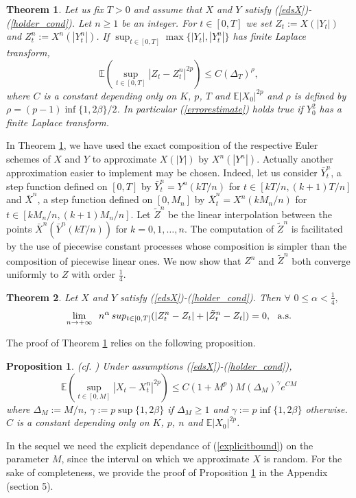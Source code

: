 \documentclass[a4paper, 11pt]{article}
\newtheorem{prop}{Proposition}
\newtheorem{thm}{Theorem}%
\newcommand{\E}{\mathbb{E}}
\newcommand{\1}{\mathbf{1}}
\begin{document}
\begin{thm}
\label{meanerror}
Let us fix $T>0$ and assume that $X$ and $Y$ satisfy (\ref{edsX})-(\ref{holder_cond}). Let $n\geq 1$ be an integer. For $t\in [0,T]$ we set $Z_t:=X(|Y_t|)$ and $Z_t^n:=X^n(|Y_t^n|)$.
If $\sup_{t\in [0,T]} \max \{|Y_t|, |Y_t^n|\}$ has finite Laplace transform, 
\begin{equation}\label{errorestimate}
\E (\sup_{t\in [0,T]} |Z_t-Z_t^n|^{2p})\leq C(\Delta_T)^\rho,
\end{equation}
where $C$ is a constant depending only on $K$, $p$, $T$ and $\E|X_0|^{2p}$ and $\rho$ is defined by $\rho=(p-1)\inf \{1,2\beta\}/2$. In particular (\ref{errorestimate}) holds true if $Y_0^2$ has a finite Laplace transform.
\end{thm}


\smallskip


\noindent In Theorem \ref{meanerror}, we have used the exact composition of the respective Euler schemes of $X$ and $Y$ to approximate $X(|Y|)$ by $X^n(|Y^n|)$. Actually another approximation easier to implement may be chosen. Indeed, let us consider $\bar{Y}_t^n$, a step function defined on $[0,T]$ by $\bar{Y}_t^n=Y^n(kT/n)$ for $t\in[kT/n,(k+1)T/n]$ and $\bar{X}^n$, a step function defined on $[0,M_n]$ by $\bar{X}_t^n=X^n(kM_n/n)$ for $t\in[kM_n/n,(k+1)M_n/n]$. Let $\tilde{Z}^n$ be the linear interpolation between the points $\bar{X}^n(\bar{Y}^n(kT/n))$ for $k=0,1,\ldots,n$. The computation of $\tilde{Z}^n$ is facilitated by the use of piecewise constant processes whose composition is simpler than the composition of piecewise linear ones. We now show that $Z^n$ and $\tilde{Z}^n$ both converge uniformly to $Z$ with order $\frac{1}{4}$. 

\begin{thm}
\label{rateofconvergence}
Let $X$ and $Y$ satisfy (\ref{edsX})-(\ref{holder_cond}). Then $\forall \, \, 0\leq \alpha < \frac{1}{4},$
\begin{equation}
\lim_{n\rightarrow +\infty} \, \, \, n^\alpha \, sup_{t\in [0,T]} {(|Z_t^n-Z_t|+|\tilde{Z}_t^n-Z_t|)}=0, \, \, \, \, {\rm a.s.}
\end{equation}
\end{thm}


\noindent The proof of Theorem \ref{meanerror} relies on the following proposition. 
 
\begin{prop}(cf. \cite{faure})
\label{errorboundforX}
Under assumptions (\ref{edsX})-(\ref{holder_cond}),
\begin{equation}\label{explicitbound}
\E (\sup_{t\in [0,M]} |X_t-X_t^n|^{2p})\leq C(1+M^p)M(\Delta_M)^\gamma e^{CM}
\end{equation}
where $\Delta_M:=M/n$, $\gamma:=p\sup \{1,2\beta\}$ if $\Delta_M\geq1$ and $\gamma:=p\inf \{1,2\beta\}$ otherwise. $C$ is a constant depending only on $K$, $p$, $n$ and $\E|X_0|^{2p}$.
\end{prop}
In the sequel we need the explicit dependance of (\ref{explicitbound}) on the parameter $M$, since the interval on which we approximate $X$ is random. For the sake of completeness, we provide the proof of Proposition \ref{errorboundforX} in the Appendix (section 5).
\end{document}
